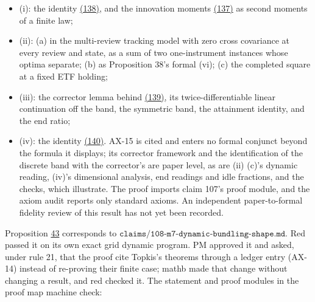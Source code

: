\documentclass[11pt]{article}
\begin{document}
\begin{itemize}
  \item (i): the identity \hyperref[eq:138]{(138)}, and the innovation moments \hyperref[eq:137]{(137)} as second
  moments of a finite law;
  \item (ii): (a) in the multi-review tracking model with zero cross
  covariance at every review and state, as a sum of two
  one-instrument instances whose optima separate; (b) as Proposition
  38's formal (vi); (c) the completed square at a fixed ETF holding;
  \item (iii): the corrector lemma behind \hyperref[eq:139]{(139)}, its twice-differentiable
  linear continuation off the band, the symmetric band, the attainment
  identity, and the end ratio;
  \item (iv): the identity \hyperref[eq:140]{(140)}.
AX-15 is cited and enters no formal conjunct beyond the formula it
displays; its corrector framework and the identification of the
discrete band with the corrector's are paper level, as are (ii) (c)'s
dynamic reading, (iv)'s dimensional analysis, end readings and idle
fractions, and the checks, which illustrate. The proof imports claim
107's proof module, and the axiom audit reports only standard axioms.
An independent paper-to-formal fidelity review of this result has not
yet been recorded.
\end{itemize}

Proposition \hyperref[res:Proposition-43]{43} corresponds to
\(\texttt{claims/108-m7-dynamic-bundling-shape.md}\). Red passed it on its own
exact grid dynamic program. PM approved it and asked, under rule 21,
that the proof cite Topkis's theorems through a ledger entry (AX-14)
instead of re-proving their finite case; mathb made that change
without changing a result, and red checked it. The statement and
proof modules in the proof map machine check:
\end{document}
